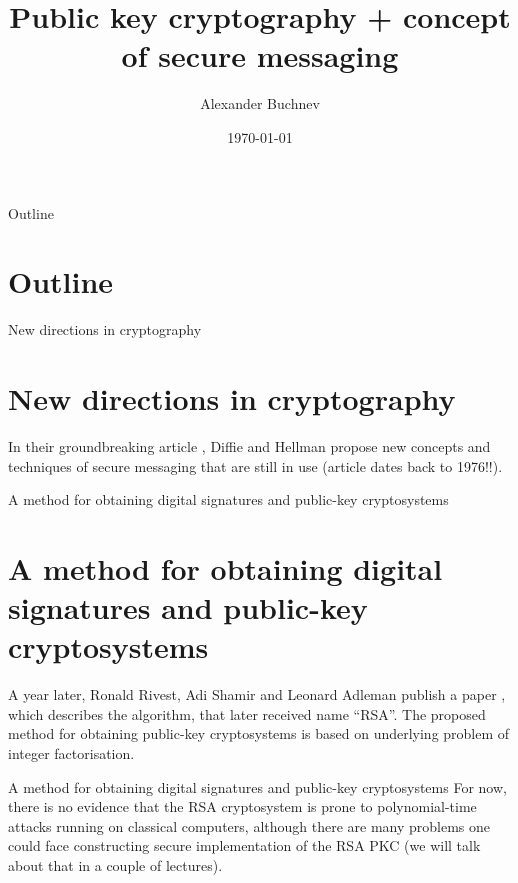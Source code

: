 \documentclass{beamer}
\title{Public key cryptography + concept of secure messaging}
\author{Alexander Buchnev}
\date{\monthYear\today}
\begin{document}
\frame{
	\titlepage
}

\newtheorem{prop}{Proposition}


\begin{frame}{Outline}
    \section{Outline}
	\tableofcontents
\end{frame}

\begin{frame}{New directions in cryptography}
    \section{New directions in cryptography}
    In their groundbreaking article \cite{diffie-hellman:1976}, Diffie and Hellman propose new concepts and techniques
    of secure messaging that are still in use (article dates back to 1976!!).
\end{frame}

\begin{frame}{A method for obtaining digital signatures and public-key cryptosystems}
    \section{A method for obtaining digital signatures and public-key cryptosystems}
    A year later, Ronald Rivest, Adi Shamir and Leonard Adleman publish a paper \cite{rsa-1978}, which describes the algorithm, that
	later received name ``RSA''. The proposed method for obtaining public-key cryptosystems is based on underlying problem of integer
    factorisation. 
\end{frame}

\begin{frame}{A method for obtaining digital signatures and public-key cryptosystems}
    For now, there is no evidence that the RSA cryptosystem is prone to polynomial-time attacks running on classical
    computers, although there are many problems one could face constructing secure 
    implementation of the RSA PKC (we will talk about that in a couple of lectures).
\end{frame}
\end{document}
